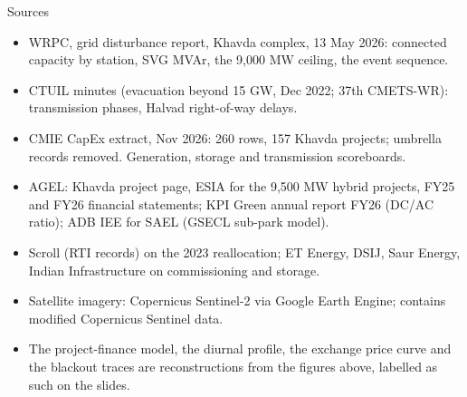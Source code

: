 \documentclass[aspectratio=169,10pt,t]{beamer}
\begin{document}
\begin{frame}{Sources}
  {\scriptsize
  \begin{itemize}\setlength{\itemsep}{2pt}
    \item WRPC, grid disturbance report, Khavda complex, 13 May 2026: connected capacity by station, SVG MVAr, the 9,000 MW ceiling, the event sequence.
    \item CTUIL minutes (evacuation beyond 15 GW, Dec 2022; 37th CMETS-WR): transmission phases, Halvad right-of-way delays.
    \item CMIE CapEx extract, Nov 2026: 260 rows, 157 Khavda projects; umbrella records removed. Generation, storage and transmission scoreboards.
    \item AGEL: Khavda project page, ESIA for the 9,500 MW hybrid projects, FY25 and FY26 financial statements; KPI Green annual report FY26 (DC/AC ratio); ADB IEE for SAEL (GSECL sub-park model).
    \item Scroll (RTI records) on the 2023 reallocation; ET Energy, DSIJ, Saur Energy, Indian Infrastructure on commissioning and storage.
    \item Satellite imagery: Copernicus Sentinel-2 via Google Earth Engine; contains modified Copernicus Sentinel data.
    \item The project-finance model, the diurnal profile, the exchange price curve and the blackout traces are reconstructions from the figures above, labelled as such on the slides.
  \end{itemize}}
\end{frame}
\end{document}
